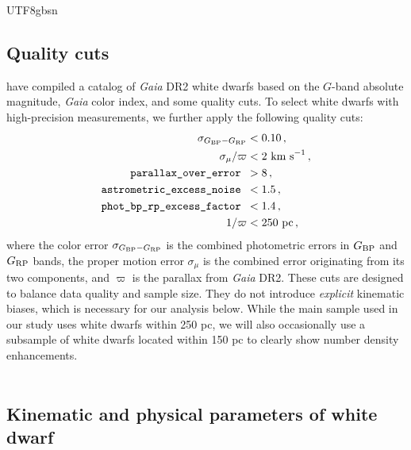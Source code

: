 \documentclass[twocolumn, times, trackchanges]{aastex63_bren}
\begin{document}
\begin{CJK*}{UTF8}{gbsn}
\subsection{Quality cuts}
\label{sec:quality cuts}

\citet{GentileFusillo_2019} have compiled a catalog of {\it Gaia} DR2 white dwarfs based on the $G$-band absolute magnitude, {\it Gaia} color index, and some quality cuts. To select white dwarfs with high-precision measurements, we further apply the following quality cuts:
\begin{align}
    \sigma_{ G_{\rm BP}-G_{\rm RP}}&<0.10\,,\\
    \sigma_{\mu}/\varpi&<\text{2 km s}^{-1}\,,\\
    \texttt{parallax\_over\_error }& > 8\,,\\
    \texttt{astrometric\_excess\_noise }& < 1.5\,,\\
    \texttt{phot\_bp\_rp\_excess\_factor }& < 1.4\,,\\
    1/\varpi &< \text{250 pc}\,,
\end{align}
where the color error $\sigma_{G_{\rm BP}-G_{\rm RP}}$ is the combined photometric errors in $G_{\rm BP}$ and $G_{\rm RP}$ bands, the proper motion error $\sigma_{\mu}$ is the combined error originating from its two components, and $\varpi$ is the parallax from {\it Gaia} DR2. These cuts are designed to balance data quality and sample size. They do not introduce \emph{explicit} kinematic biases, which is necessary for our analysis below.
While the main sample used in our study uses white dwarfs within 250 pc, we will also occasionally use a subsample of white dwarfs located within 150 pc to clearly show number density enhancements.
\\
\\

\subsection{Kinematic and physical parameters of white dwarf}
\label{sec:quantity definitions}


\end{CJK*}
\end{document}
